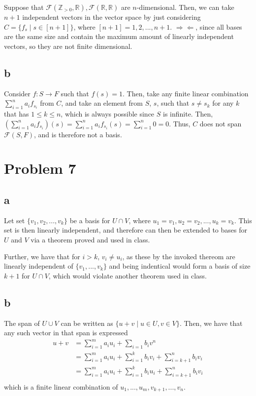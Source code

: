 \documentclass[12pt,letterpaper]{article}
\theoremstyle{definition}
\newcommand{\contra}{\Rightarrow\!\Leftarrow}
\newcommand{\R}{\mathbb{R}}
\newcommand{\Zg}{\mathbb{Z}_{>0}}
\begin{document}
Suppose that $\mathcal{F}(\Zg, \R), \mathcal{F}(\R, \R)$ are $n$-dimensional.
Then, we can take $n + 1$ independent vectors in the vector space
by just considering $C = \{f_s \mid s \in [n + 1]\}$, where $[n + 1] = 1, 2, ..., n
+ 1$. $\contra$, since all bases are the same size and contain the maximum
amount of linearly independent vectors, so they are not finite dimensional.

\subsection*{b}

Consider $f: S \rightarrow F$ such that $f(s) = 1$. Then, take any finite linear
combination $\sum_{i=1}^na_if_{s_i}$ from $C$, and take an element from $S$, $s$,
such that $s \neq s_k$ for any $k$ that has $1 \leq k \leq n$, which is always
possible since $S$ is infinite. Then, $(\sum_{i=1}^na_if_{s_i})(s) =
\sum_{i=1}^na_if_{s_i}(s) = \sum_{i=1}^n 0 = 0$. Thus, $C$ does not span
$\mathcal{F}(S, F)$, and is therefore not a basis.


\section*{Problem 7}

\subsection*{a}

Let set $\{v_1, v_2, ..., v_k\}$ be a basis for $U \cap V$, where $u_1 = v_1,
u_2 = v_2, ..., u_k = v_k$. This set is then linearly independent, and therefore
can then be extended to bases for $U$ and $V$ via a theorem proved and used in
class.

Further, we have that for $i > k$, $v_i \neq u_i$, as these by the invoked
thereom are linearly independent of $\{v_1, ..., v_k\}$ and being indentical
would form a basis of size $k + 1$ for $U \cap V$, which would violate another
theorem used in class.

\subsection*{b}

The span of $U \cup V$ can be written as $\{u + v \mid u \in U, v \in V\}$.
Then, we have that any such vector in that span is expressed
\begin{align*}
  u + v &= \sum_{i=1}^ma_iu_i + \sum_{i=1}b_iv^n \\
        &= \sum_{i=1}^ma_iu_i + \sum_{i=1}^kb_iv_i + \sum_{i=k+1}^nb_iv_i \\
        &= \sum_{i=1}^ma_iu_i + \sum_{i=1}^kb_iu_i + \sum_{i=k+1}^nb_iv_i \\
\end{align*}
which is a finite linear combination of $u_1, ..., u_m, v_{k+1}, ..., v_{n}$.
\end{document}
